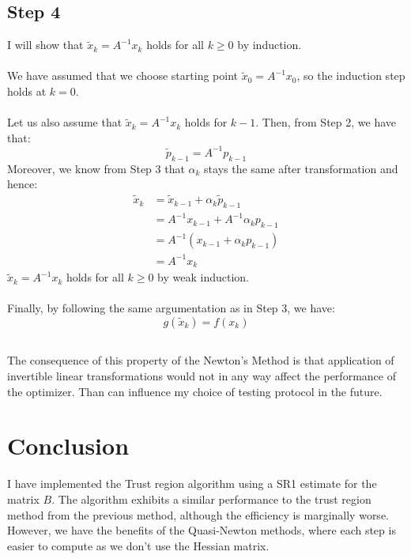\documentclass[a4paper]{article}
\begin{document}
\subsection{Step 4}
I will show that $\tilde{x}_k = A^{-1}x_k$ holds for all
$k\geq 0$ by induction. \\\\
We have assumed that we choose starting point $\tilde{x}_0 = A^{-1}x_0$, so the
induction step holds at $k=0$.\\\\
Let us also assume that $\tilde{x}_k = A^{-1}x_k$ holds for $k-1$. Then, from
Step 2, we have that:
\[
\tilde{p}_{k-1} = A^{-1}p_{k-1}
\]
Moreover, we know from Step 3 that $\alpha_k$ stays the same after
transformation and hence:
\[
\begin{aligned}
  \tilde{x}_{k}
  &= \tilde{x}_{k-1} + \alpha_k \tilde{p}_{k-1}\\
  &= A^{-1}x_{k-1} + A^{-1}\alpha_k p_{k-1}\\
  &= A^{-1}(x_{k-1} + \alpha_k p_{k-1})\\
  &= A^{-1}x_k
\end{aligned}
\]
$\tilde{x}_k = A^{-1}x_k$ holds for all $k\geq 0$ by weak induction.\\\\
Finally, by following the same argumentation as in Step 3, we have:
\[
  g(\tilde{x}_k)= f(x_k)
\]

\subsection{}
The consequence of this property of the Newton's Method is that application of
invertible linear transformations would not in any way affect the performance of
the optimizer. Than can influence my choice of testing protocol in the future.

\section{Conclusion}
I have implemented the Trust region algorithm using a SR1 estimate for the
matrix $B$. The algorithm exhibits a similar performance to the trust region
method from the previous method, although the efficiency is marginally worse.
However, we have the benefits of the Quasi-Newton methods, where each step is
easier to compute as we don't use the Hessian matrix.
\end{document}
